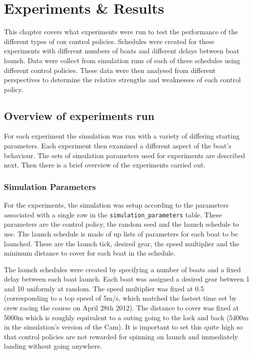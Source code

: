 \chapter{Experiments \& Results}\label{chapter:experiments}

This chapter covers what experiments were run to test the performance of the different types of cox control policies. Schedules were created for these experiments with different numbers of boats and different delays between boat launch. Data were collect from simulation runs of each of these schedules using different control policies. These data were then analysed from different perspectives to determine the relative strengths and weaknesses of each control policy.

\section{Overview of experiments run}
  For each experiment the simulation was run with a variety of
  differing starting parameters. Each experiment then examined a
  different aspect of the boat's behaviour. The sets of simulation
  parameters used for experiments are described next. Then there is a
  brief overview of the experiments carried out.

  \subsection{Simulation Parameters}
  For the experiments, the simulation was setup according to the
  parameters associated with a single row in the
  \texttt{simulation\_parameters} table. These parameters are the control
  policy, the random seed and the launch schedule to use. The launch
  schedule is made of up lists of parameters for each boat to be
  launched. These are the launch tick, desired gear, the speed
  multiplier and the minimum distance to cover for each boat in the
  schedule.
  
  The launch schedules were created by specifying a number of boats
  and a fixed delay between each boat launch. Each boat was assigned a
  desired gear between 1 and 10 uniformly at random. The speed
  multiplier was fixed at 0.5 (corresponding to a top speed of 5m/s,
  which matched the fastest time set by crew racing the course on
  April 28th 2012). The distance to cover was fixed at 5000m which is
  roughly equivalent to a outing going to the lock and back (5400m in
  the simulation's version of the Cam). It is important to set this
  quite high so that control policies are not rewarded for spinning on
  launch and immediately landing without going anywhere. 
  

